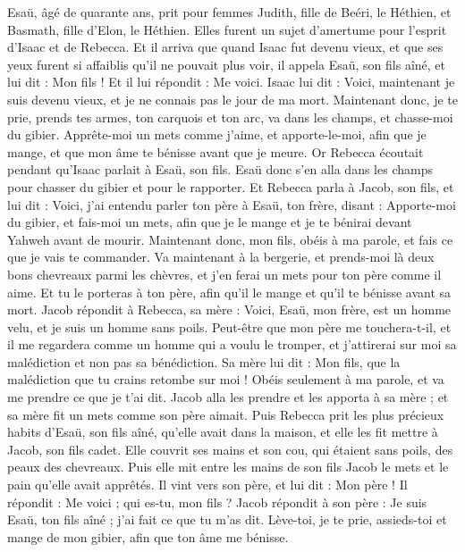 \begin{multicols}{2}
Esaü, âgé de quarante ans, prit pour femmes Judith, fille de Beéri, le Héthien, et Basmath, fille d'Elon, le Héthien.
Elles furent un sujet d'amertume pour l'esprit d'Isaac et de Rebecca.
\VerseOne{}Et il arriva que quand Isaac fut devenu vieux, et que ses yeux furent si affaiblis qu'il ne pouvait plus voir, il appela Esaü, son fils aîné, et lui dit : Mon fils ! Et il lui répondit : Me voici.
Isaac lui dit : Voici, maintenant je suis devenu vieux, et je ne connais pas le jour de ma mort.
Maintenant donc, je te prie, prends tes armes, ton carquois et ton arc, va dans les champs, et chasse-moi du gibier.
Apprête-moi un mets comme j'aime, et apporte-le-moi, afin que je mange, et que mon âme te bénisse avant que je meure.
Or Rebecca écoutait pendant qu'Isaac parlait à Esaü, son fils. Esaü donc s'en alla dans les champs pour chasser du gibier et pour le rapporter.
Et Rebecca parla à Jacob, son fils, et lui dit : Voici, j'ai entendu parler ton père à Esaü, ton frère, disant :
Apporte-moi du gibier, et fais-moi un mets, afin que je le mange et je te bénirai devant Yahweh avant de mourir.
Maintenant donc, mon fils, obéis à ma parole, et fais ce que je vais te commander.
Va maintenant à la bergerie, et prends-moi là deux bons chevreaux parmi les chèvres, et j'en ferai un mets pour ton père comme il aime.
Et tu le porteras à ton père, afin qu'il le mange et qu'il te bénisse avant sa mort.
Jacob répondit à Rebecca, sa mère : Voici, Esaü, mon frère, est un homme velu, et je suis un homme sans poils.
Peut-être que mon père me touchera-t-il, et il me regardera comme un homme qui a voulu le tromper, et j'attirerai sur moi sa malédiction et non pas sa bénédiction.
Sa mère lui dit : Mon fils, que la malédiction que tu crains retombe sur moi ! Obéis seulement à ma parole, et va me prendre ce que je t'ai dit.
Jacob alla les prendre et les apporta à sa mère ; et sa mère fit un mets comme son père aimait.
Puis Rebecca prit les plus précieux habits d'Esaü, son fils aîné, qu'elle avait dans la maison, et elle les fit mettre à Jacob, son fils cadet.
Elle couvrit ses mains et son cou, qui étaient sans poils, des peaux des chevreaux.
Puis elle mit entre les mains de son fils Jacob le mets et le pain qu'elle avait apprêtés.
Il vint vers son père, et lui dit : Mon père ! Il répondit : Me voici ; qui es-tu, mon fils ?
Jacob répondit à son père : Je suis Esaü, ton fils aîné ; j'ai fait ce que tu m'as dit. Lève-toi, je te prie, assieds-toi et mange de mon gibier, afin que ton âme me bénisse.

\end{multicols}
